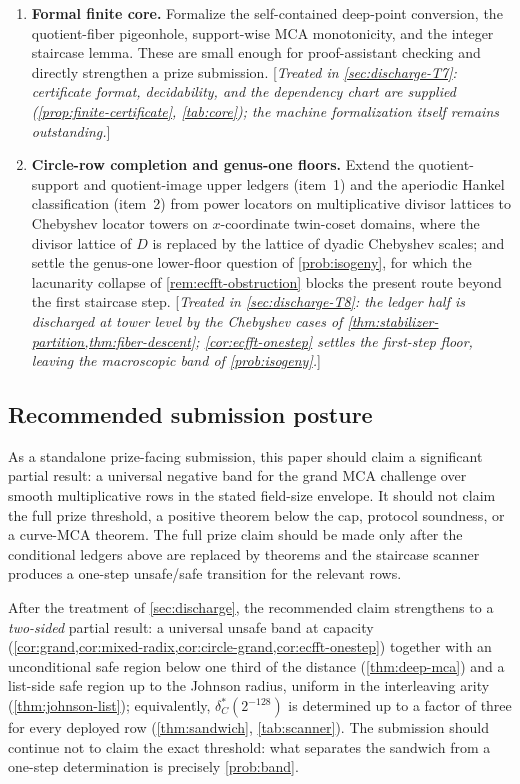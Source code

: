 \documentclass[11pt]{article}
\theoremstyle{definition}
\theoremstyle{remark}
\begin{document}
\begin{enumerate}[label=\textbf{T\arabic*.},leftmargin=2.5em]
\item \textbf{Formal finite core.}  Formalize the self-contained deep-point
conversion, the quotient-fiber pigeonhole, support-wise MCA monotonicity, and
the integer staircase lemma.  These are small enough for proof-assistant
checking and directly strengthen a prize submission. [\emph{Treated in \cref{sec:discharge-T7}: certificate format, decidability, and the dependency chart are supplied (\cref{prop:finite-certificate}, \cref{tab:core}); the machine formalization itself remains outstanding.}]

\item \textbf{Circle-row completion and genus-one floors.}  Extend the
quotient-support and quotient-image upper ledgers (item~1) and the aperiodic
Hankel classification (item~2) from power locators on multiplicative divisor
lattices to Chebyshev locator towers on $x$-coordinate twin-coset domains,
where the divisor lattice of $D$ is replaced by the lattice of dyadic
Chebyshev scales; and settle the genus-one lower-floor question of
\cref{prob:isogeny}, for which the lacunarity collapse of
\cref{rem:ecfft-obstruction} blocks the present route beyond the first
staircase step. [\emph{Treated in \cref{sec:discharge-T8}: the ledger half is discharged at tower level by the Chebyshev cases of \cref{thm:stabilizer-partition,thm:fiber-descent}; \cref{cor:ecfft-onestep} settles the first-step floor, leaving the macroscopic band of \cref{prob:isogeny}.}]
\end{enumerate}

\subsection{Recommended submission posture}

As a standalone prize-facing submission, this paper should claim a significant
partial result: a universal negative band for the grand MCA challenge over
smooth multiplicative rows in the stated field-size envelope.  It should not
claim the full prize threshold, a positive theorem below the cap, protocol
soundness, or a curve-MCA theorem.  The full prize claim should be made only
after the conditional ledgers above are replaced by theorems and the staircase
scanner produces a one-step unsafe/safe transition for the relevant rows.

After the treatment of \cref{sec:discharge}, the recommended claim strengthens to a \emph{two-sided} partial result: a universal unsafe band at capacity (\cref{cor:grand,cor:mixed-radix,cor:circle-grand,cor:ecfft-onestep}) together with an unconditional safe region below one third of the distance (\cref{thm:deep-mca}) and a list-side safe region up to the Johnson radius, uniform in the interleaving arity (\cref{thm:johnson-list}); equivalently, $\delta^*_C(2^{-128})$ is determined up to a factor of three for every deployed row (\cref{thm:sandwich}, \cref{tab:scanner}). The submission should continue not to claim the exact threshold: what separates the sandwich from a one-step determination is precisely \cref{prob:band}.
\end{document}
